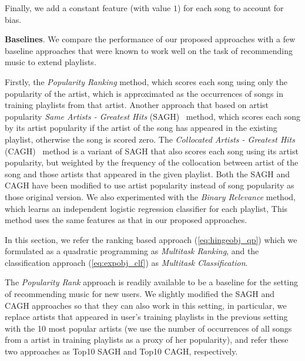 Finally, we add a constant feature (with value $1$) for each song to account for bias. %


{\bf Baselines}.
We compare the performance of our proposed approaches with a few baseline approaches
that were known to work well on the task of recommending music to extend playlists.

Firstly, the {\it Popularity Ranking} method, which scores each song using only the popularity of the artist,
which is approximated as the occurrences of songs in training playlists from that artist.
%
Another approach that based on artist popularity {\it Same Artists - Greatest Hits} (SAGH)~\cite{mcfee2012million} method,
which scores each song by its artist popularity if the artist of the song has appeared in the existing playlist,
otherwise the song is scored zero.
%
The {\it Collocated Artists - Greatest Hits} (CAGH)~\cite{bonnin2013evaluating} method is a variant of SAGH
that also scores each song using its artist popularity, but weighted by the frequency of the collocation between artist of the song
and those artists that appeared in the given playlist.
Both the SAGH and CAGH have been modified to use artist popularity instead of song popularity as those original version.
%
We also experimented with the {\it Binary Relevance} method, which learns an independent logistic regression classifier for each playlist,
This method uses the same features as that in our proposed approaches.

In this section, we refer the ranking based approach (\ref{eq:hingeobj_qp}) which we formulated as a quadratic programming as {\it Multitask Ranking},
and the classification approach (\ref{eq:expobj_clf}) as {\it Multitask Classification}.



The {\it Popularity Rank} approach is readily available to be a baseline for the setting of recommending music for new users.
%
We slightly modified the SAGH and CAGH approaches so that they can also work in this setting,
in particular, we replace artists that appeared in user's training playlists in the previous setting with the 10 most popular artists
(we use the number of occurrences of all songs from a artist in training playlists as a proxy of her popularity),
and refer these two approaches as Top10 SAGH and Top10 CAGH, respectively.



